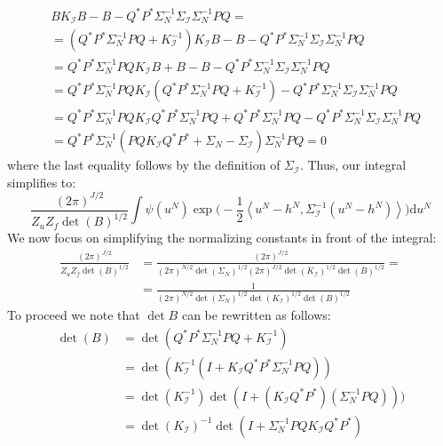 \begin{align*}
    &BK_{\mathcal{I}}B-B-Q^{*}P^{*}\Sigma_{N}^{-1}\Sigma_{\mathcal{I}}\Sigma_{N}^{-1}PQ = \\
    &=(Q^{*}P^{*}\Sigma_{N}^{-1}PQ+K_{\mathcal{I}}^{-1})K_{\mathcal{I}}B-B-Q^{*}P^{*}\Sigma_{N}^{-1}\Sigma_{\mathcal{I}}\Sigma_{N}^{-1}PQ \\
    &=Q^{*}P^{*}\Sigma_{N}^{-1}PQK_{\mathcal{I}}B+B-B-Q^{*}P^{*}\Sigma_{N}^{-1}\Sigma_{\mathcal{I}}\Sigma_{N}^{-1}PQ \\
    &=Q^{*}P^{*}\Sigma_{N}^{-1}PQK_{\mathcal{I}}(Q^{*}P^{*}\Sigma_{N}^{-1}PQ+K_{\mathcal{I}}^{-1})-Q^{*}P^{*}\Sigma_{N}^{-1}\Sigma_{\mathcal{I}}\Sigma_{N}^{-1}PQ \\
    &=Q^{*}P^{*}\Sigma_{N}^{-1}PQK_{\mathcal{I}}Q^{*}P^{*}\Sigma_{N}^{-1}PQ + Q^{*}P^{*}\Sigma_{N}^{-1}PQ - Q^{*}P^{*}\Sigma_{N}^{-1}\Sigma_{\mathcal{I}}\Sigma_{N}^{-1}PQ \\
    &= Q^{*}P^{*}\Sigma_{N}^{-1}(PQK_{\mathcal{I}}Q^{*}P^{*}+\Sigma_{N}-\Sigma_{\mathcal{I}})\Sigma_{N}^{-1}PQ = 0
\end{align*}
where the last equality follows by the definition of $\Sigma_{\mathcal{I}}$. Thus, our integral simplifies to:
\begin{equation}
    \frac{(2\pi)^{J/2}}{Z_{u}Z_{f}\det(B)^{1/2}}\int\psi(u^{N})\exp\Big(-\frac{1}{2}\left\langle u^{N}-h^{N},\Sigma_{\mathcal{I}}^{-1}(u^{N}-h^{N}) \right\rangle\Big)\mathrm{d}u^{N}
\end{equation}
We now focus on simplifying the normalizing constants in front of the integral:
\begin{align*}
    \frac{(2\pi)^{J/2}}{Z_{u}Z_{f}\det(B)^{1/2}}&=\frac{(2\pi)^{J/2}}{(2\pi)^{N/2}\det(\Sigma_N)^{1/2}(2\pi)^{J/2}\det(K_\mathcal{I})^{1/2}\det(B)^{1/2}}= \\
    &=\frac{1}{(2\pi)^{N/2}\det(\Sigma_N)^{1/2}\det(K_\mathcal{I})^{1/2}\det(B)^{1/2}}
\end{align*}
To proceed we note that $\det{B}$ can be rewritten as follows:
\begin{align*}
    \det(B)&=\det(Q^{*}P^{*}\Sigma_{N}^{-1}PQ + K_{\mathcal{I}}^{-1}) \\
    &=\det(K_{\mathcal{I}}^{-1}(I+K_{\mathcal{I}}Q^{*}P^{*}\Sigma_{N}^{-1}PQ)) \\
    &=\det(K_{\mathcal{I}}^{-1})\det(I+(K_{\mathcal{I}}Q^{*}P^{*})(\Sigma_{N}^{-1}PQ))) \\
    &=\det(K_{\mathcal{I}})^{-1}\det(I+\Sigma_{N}^{-1}PQK_{\mathcal{I}}Q^{*}P^{*})
\end{align*}
